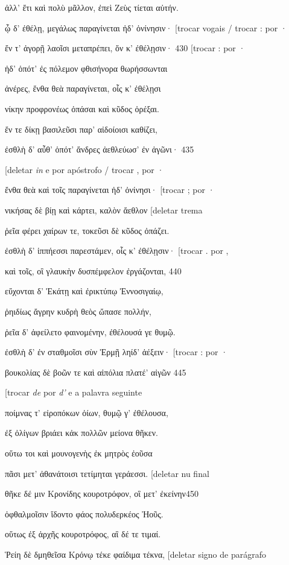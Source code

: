 ἀλλ' ἔτι καὶ πολὺ μᾶλλον, ἐπεὶ Ζεὺς τίεται αὐτήν.

ᾧ δ' ἐθέλῃ, μεγάλως παραγίνεται ἠδ' ὀνίνησιν· {[}trocar vogais / trocar
: por ·

ἔν τ' ἀγορῇ λαοῖσι μεταπρέπει, ὅν κ' ἐθέλῃσιν· 430 {[}trocar : por ·

ἠδ' ὁπότ' ἐς πόλεμον φθισήνορα θωρήσσωνται

ἀνέρες, ἔνθα θεὰ παραγίνεται, οἷς κ' ἐθέλῃσι

νίκην προφρονέως ὀπάσαι καὶ κῦδος ὀρέξαι.

ἔν τε δίκῃ βασιλεῦσι παρ' αἰδοίοισι καθίζει,

ἐσθλὴ δ' αὖθ' ὁπότ' ἄνδρες ἀεθλεύωσ' ἐν ἀγῶνι· 435

{[}deletar \emph{in} e por apóstrofo / trocar , por ·

ἔνθα θεὰ καὶ τοῖς παραγίνεται ἠδ' ὀνίνησι· {[}trocar ; por ·

νικήσας δὲ βίῃ καὶ κάρτει, καλὸν ἄεθλον {[}deletar trema

ῥεῖα φέρει χαίρων τε, τοκεῦσι δὲ κῦδος ὀπάζει.

ἐσθλὴ δ' ἱππήεσσι παρεστάμεν, οἷς κ' ἐθέλῃσιν· {[}trocar . por ,

καὶ τοῖς, οἳ γλαυκὴν δυσπέμφελον ἐργάζονται, 440

εὔχονται δ' Ἑκάτῃ καὶ ἐρικτύπῳ Ἐννοσιγαίῳ,

ῥηιδίως ἄγρην κυδρὴ θεὸς ὤπασε πολλήν,

ῥεῖα δ' ἀφείλετο φαινομένην, ἐθέλουσά γε θυμῷ.

ἐσθλὴ δ' ἐν σταθμοῖσι σὺν Ἑρμῇ ληίδ' ἀέξειν· {[}trocar : por ·

βουκολίας δὲ βοῶν τε καὶ αἰπόλια πλατέ' αἰγῶν 445

{[}trocar \emph{de} por \emph{d'} e a palavra seguinte

ποίμνας τ' εἰροπόκων ὀίων, θυμῷ γ' ἐθέλουσα,

ἐξ ὀλίγων βριάει κἀκ πολλῶν μείονα θῆκεν.

οὕτω τοι καὶ μουνογενὴς ἐκ μητρὸς ἐοῦσα

πᾶσι μετ' ἀθανάτοισι τετίμηται γεράεσσι. {[}deletar nu final

θῆκε δέ μιν Κρονίδης κουροτρόφον, οἳ μετ' ἐκείνην450

ὀφθαλμοῖσιν ἴδοντο φάος πολυδερκέος Ἠοῦς.

οὕτως ἐξ ἀρχῆς κουροτρόφος, αἳ δέ τε τιμαί.

Ῥείη δὲ δμηθεῖσα Κρόνῳ τέκε φαίδιμα τέκνα, {[}deletar signo de parágrafo

